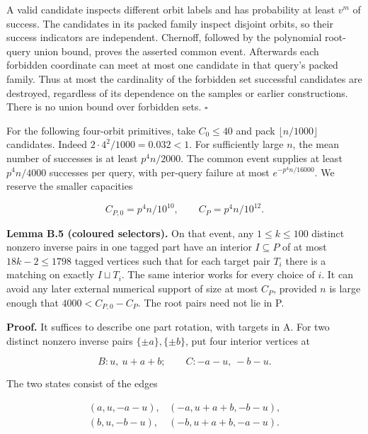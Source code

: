 \documentclass[11pt,a4paper]{article}
\newcommand{\statementstart}{\par\addvspace{6pt plus 1pt minus 1pt}\noindent}
\newcommand{\labelledparagraphstart}{\par\addvspace{3pt plus 1pt minus 1pt}\noindent}
\begin{document}
A valid candidate inspects different orbit labels and has probability at least \(v^m\) of success. The candidates in its packed family inspect disjoint orbits, so their success indicators are independent. Chernoff, followed by the polynomial root-query union bound, proves the asserted common event. Afterwards each forbidden coordinate can meet at most one candidate in that query's packed family. Thus at most the cardinality of the forbidden set successful candidates are destroyed, regardless of its dependence on the samples or earlier constructions. There is no union bound over forbidden sets. \(\square\)

For the following four-orbit primitives, take \(C_0\leq40\) and pack \(\lfloor n/1000\rfloor\) candidates. Indeed \(2\cdot4^2/1000=0.032<1\). For sufficiently large \(n\), the mean number of successes is at least \(p^4n/2000\). The common event supplies at least \(p^4n/4000\) successes per query, with per-query failure at most \(e^{-p^4n/16000}\). We reserve the smaller capacities

\begin{equation}
C_{P,0}=p^4n/10^{10},\qquad C_P=p^4n/10^{12}.
\tag{AC5}\label{eq:AC5}
\end{equation}

\statementstart\textbf{Lemma B.5 (coloured selectors).} On that event, any \(1\leq k\leq100\) distinct nonzero inverse pairs in one tagged part have an interior \(I\subseteq P\) of at most \(18k-2\leq1798\) tagged vertices such that for each target pair \(T_i\) there is a matching on exactly \(I\sqcup T_i\). The same interior works for every choice of \(i\). It can avoid any later external numerical support of size at most \(C_P\), provided \(n\) is large enough that \(4000<C_{P,0}-C_P\). The root pairs need not lie in P.

\labelledparagraphstart\textbf{Proof.} It suffices to describe one part rotation, with targets in A. For two distinct nonzero inverse pairs \(\{\pm a\},\{\pm b\}\), put four interior vertices at

\begin{equation}
B:u,\ u+a+b;\qquad C:-a-u,\ -b-u.
\tag{AC6}\label{eq:AC6}
\end{equation}

The two states consist of the edges

\begin{equation}
\begin{array}{ll}
(a,u,-a-u),&(-a,u+a+b,-b-u),\\
(b,u,-b-u),&(-b,u+a+b,-a-u).
\end{array}
\tag{AC7}\label{eq:AC7}
\end{equation}
\end{document}
